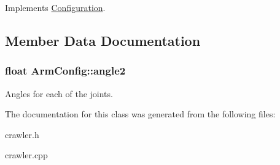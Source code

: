 Implements \hyperlink{classConfiguration_a0bc4a5154c2836cc8976049810b35548}{Configuration}.



\subsection{Member Data Documentation}
\hypertarget{classArmConfig_a8675cabacd6a5a75d9dd21696b14f645}{
\subsubsection[{angle2}]{\setlength{\rightskip}{0pt plus 5cm}float Arm\-Config\-::angle2}}\label{classArmConfig_a8675cabacd6a5a75d9dd21696b14f645}
Angles for each of the joints. 

The documentation for this class was generated from the following files\-:\begin{DoxyCompactItemize}
\item 
crawler.\-h\item 
crawler.\-cpp\end{DoxyCompactItemize}
